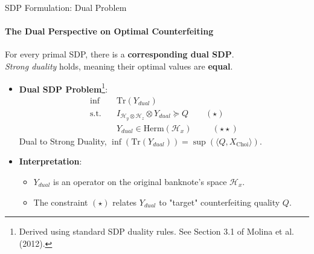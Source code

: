 \documentclass{beamer}
\begin{document}
\begin{frame}{SDP Formulation: Dual Problem}
    \framesubtitle{The Dual Perspective on Optimal Counterfeiting}
    For every primal SDP, there is a \textbf{corresponding dual SDP}. \\
    \textit{Strong duality} holds, meaning their optimal values are \textbf{equal}.
    \begin{itemize}
        \item \textbf{Dual SDP Problem}\footnote{Derived using standard SDP duality rules. See Section 3.1 of Molina et al. (2012).}:
        \begin{align*}
            \inf \quad & \mathrm{Tr}(Y_{dual}) \\
            \text{s.t.} \quad & I_{\mathcal{H}_y \otimes \mathcal{H}_z} \otimes Y_{dual} \succeq Q \qquad(\star)\\
            & Y_{dual} \in \mathrm{Herm}(\mathcal{H}_x)\ \ \qquad(\star\star)
        \end{align*}
        Dual to Strong Duality, $\inf{(\mathrm{Tr}(Y_{dual}))=\sup(\langle Q,X_{\text{Choi}}\rangle)}.$
        \item \textbf{Interpretation}:
        \begin{itemize}
            \item $Y_{dual}$ is an operator on the original banknote's space $\mathcal{H}_x$.
            \item The constraint $(\star)$ relates $Y_{dual}$ to "target" counterfeiting quality $Q$.
        \end{itemize}
    \end{itemize}
\end{frame}
\end{document}

